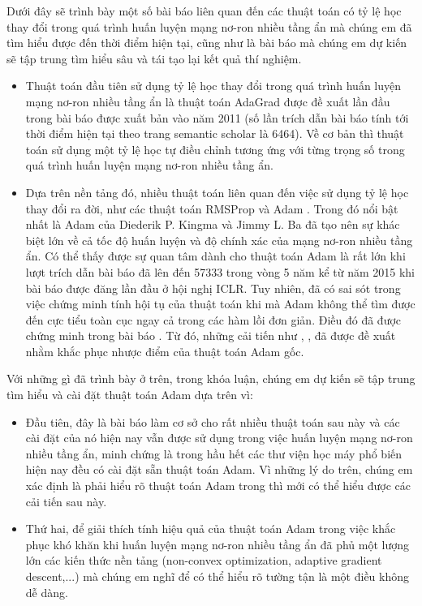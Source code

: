 \documentclass{article}[14pt]
\begin{document}
{    %
    Dưới đây sẽ trình bày một số bài báo liên quan đến các thuật toán có tỷ lệ học thay đổi trong quá trình huấn luyện mạng nơ-ron nhiều tầng ẩn mà chúng em đã tìm hiểu được đến thời điểm hiện tại, cũng như là bài báo mà chúng em dự kiến sẽ tập trung tìm hiểu sâu và tái tạo lại kết quả thí nghiệm.
    \begin{itemize}
        \item Thuật toán đầu tiên sử dụng tỷ lệ học thay đổi trong quá trình huấn luyện mạng nơ-ron nhiều tầng ẩn là thuật toán AdaGrad được đề xuất lần đầu trong bài báo \cite{Duchi2011AdaptiveSM} được xuất bản vào năm 2011 (số lần trích dẫn bài báo tính tới thời điểm hiện tại theo trang semantic scholar là 6464). Về cơ bản thì thuật toán sử dụng một tỷ lệ học tự điều chỉnh tương ứng với từng trọng số trong quá trình huấn luyện mạng nơ-ron nhiều tầng ẩn.
        \item Dựa trên nền tảng đó, nhiều thuật toán liên quan đến việc sử dụng tỷ lệ học thay đổi ra đời, như các thuật toán RMSProp \cite{Tieleman2012RMSProp} và Adam \cite{Kingma2015AdamAM}. Trong đó nổi bật nhất là Adam của Diederik P. Kingma và Jimmy L. Ba đã tạo nên sự khác biệt lớn về cả tốc độ huấn luyện và độ chính xác của mạng nơ-ron nhiều tầng ẩn. Có thể thấy được sự quan tâm dành cho thuật toán Adam là rất lớn khi lượt trích dẫn bài báo đã lên đến 57333 trong vòng 5 năm kể từ năm 2015 khi bài báo được đăng lần đầu ở hội nghị ICLR. Tuy nhiên, đã có sai sót trong việc chứng minh tính hội tụ của thuật toán khi mà Adam không thể tìm được đến cực tiểu toàn cục ngay cả trong các hàm lồi đơn giản. Điều đó đã được chứng minh trong bài báo \cite{Reddi2018OnTC}. Từ đó, những cải tiến như \cite{Reddi2018OnTC}, \cite{Dozat2016IncorporatingNM}, \cite{Zhang2017NormalizedDA} đã được đề xuất nhằm khắc phục nhược điểm của thuật toán Adam gốc.
    \end{itemize}
    Với những gì đã trình bày ở trên, trong khóa luận, chúng em dự kiến sẽ tập trung tìm hiểu và cài đặt thuật toán Adam dựa trên \cite{Kingma2015AdamAM} vì:
    \begin{itemize}
        \item Đầu tiên, đây là bài báo làm cơ sở cho rất nhiều thuật toán sau này và các cài đặt của nó hiện nay vẫn được sử dụng trong việc huấn luyện mạng nơ-ron nhiều tầng ẩn, minh chứng là trong hầu hết các thư viện học máy phổ biến hiện nay đều có cài đặt sẵn thuật toán Adam. Vì những lý do trên, chúng em xác định là phải hiểu rõ thuật toán Adam trong \cite{Kingma2015AdamAM} thì mới có thể hiểu được các cải tiến sau này.
        \item Thứ hai, để giải thích tính hiệu quả của thuật toán Adam trong việc khắc phục khó khăn khi huấn luyện mạng nơ-ron nhiều tầng ẩn đã phủ một lượng lớn các kiến thức nền tảng (non-convex optimization, adaptive gradient descent,...) mà chúng em nghĩ để có thể hiểu rõ tường tận là một điều không dễ dàng.
    \end{itemize}
    
}
\end{document}
